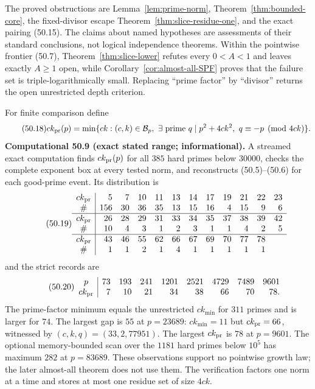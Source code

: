 \documentclass[10pt,reqno]{amsart}
\theoremstyle{definition}
\newcommand{\1}{\mathbf 1}
\begin{document}
\endgroup
The proved obstructions are Lemma~\ref{lem:prime-norm},
Theorem~\ref{thm:bounded-core}, the fixed-divisor escape
Theorem~\ref{thm:slice-residue-one}, and the exact pairing (50.15).  The
claims about named hypotheses are assessments of their standard
conclusions, not logical independence theorems.  Within the pointwise
frontier (50.7), Theorem~\ref{thm:slice-lower} refutes every $0<A<1$ and
leaves exactly $A\geq1$ open, while Corollary~\ref{cor:almost-all-SPF}
proves that the failure set is triple-logarithmically small.  Replacing ``prime factor'' by
``divisor'' returns the open unrestricted depth criterion.

For finite comparison define
\begin{equation}\tag{50.18}
 ck_{\rm pr}(p)=\min\{ck:(c,k)\in\mathcal B_p,
 \ \exists\hbox{ prime }q\mid p^2+4ck^2,
 \ q\equiv-p\pmod {4ck}\}.
\end{equation}
\medskip\noindent\textbf{Computational 50.9 (exact stated range;
informational).}
A streamed exact computation finds $ck_{\rm pr}(p)$ for all $385$ hard
primes below $30000$, checks the complete exponent box at every tested norm,
and reconstructs (50.5)--(50.6) for each good-prime event.  Its distribution
is
\begin{equation}\tag{50.19}
\begin{array}{c|rrrrrrrrrrr}
ck_{\rm pr}&5&7&10&11&13&14&17&19&21&22&23\\
\#&156&30&36&35&13&15&16&4&15&9&6\\ \hline
ck_{\rm pr}&26&28&29&31&33&34&35&37&38&39&42\\
\#&10&4&3&1&2&3&1&1&4&2&5\\ \hline
ck_{\rm pr}&43&46&55&62&66&67&69&70&77&78&\\
\#&1&1&2&1&4&1&1&1&1&1&
\end{array}
\end{equation}
and the strict records are
\begin{equation}\tag{50.20}
\begin{array}{c|rrrrrrrr}
p&73&193&241&1201&2521&4729&7489&9601\\
ck_{\rm pr}&7&10&21&34&38&66&70&78.
\end{array}
\end{equation}
The prime-factor minimum equals the unrestricted $ck_{\min}$ for $311$
primes and is larger for $74$.  The largest gap is $55$ at $p=23689$:
$ck_{\min}=11$ but $ck_{\rm pr}=66$, witnessed by
$(c,k,q)=(33,2,77951)$.  The largest $ck_{\rm pr}$ is $78$ at $p=9601$.
The optional memory-bounded scan over the $1181$ hard primes below $10^5$
has maximum $282$ at $p=83689$.  These observations support no pointwise
growth law; the later almost-all theorem does not use them.  The verification
factors one norm at a time and stores at most one residue set of size $4ck$.
\end{document}
